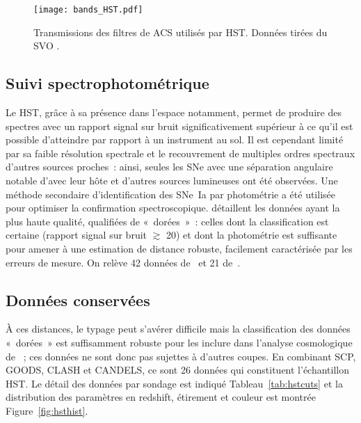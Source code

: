 \documentclass[../main/main.tex]{subfiles}
\begin{document}
\begin{figure}[!ht]
    \centering
    \texttt{[image: bands\_HST.pdf]}
    \caption[Transmissions des filtres de la caméra du sondage HST]
    {Transmissions des filtres de ACS utilisés par HST. Données tirées du SVO
    \citep{rodrigo2020}.}
    \label{fig:hstbands}
\end{figure}

\subsection{Suivi spectrophotométrique}\label{ssec:hstspectro}

Le HST, grâce à sa présence dans l'espace notamment, permet de produire des
spectres avec un rapport signal sur bruit significativement supérieur à ce qu'il
est possible d'atteindre par rapport à un instrument au sol. Il est cependant
limité par sa faible résolution spectrale et le recouvrement de multiples ordres
spectraux d'autres sources proches~: ainsi, seules les SNe avec une séparation
angulaire notable d'avec leur hôte et d'autres sources lumineuses ont été
observées. Une méthode secondaire d'identification des SNe~Ia par photométrie a
été utilisée pour optimiser la confirmation spectroscopique. \cite{riess2007}
détaillent les données ayant la plus haute qualité, qualifiées de «~dorées~»~:
celles dont la classification est certaine (rapport signal sur bruit $\gtrsim$
20) et dont la photométrie est suffisante pour amener à une estimation de
distance robuste, facilement caractérisée par les erreurs de mesure. On relève
42 données de~\cite{strolger2004} et 21 de~\cite{riess2007}.

\subsection{Données conservées}\label{ssec:hstdata}

À ces distances, le typage peut s'avérer difficile mais la classification des
données «~dorées~» est suffisamment robuste pour les inclure dans l'analyse
cosmologique de \citep{scolnic2018}~; ces données ne sont donc pas sujettes à
d'autres coupes. En combinant SCP, GOODS, CLASH et CANDELS, ce sont 26 données
qui constituent l'échantillon HST. Le détail des données par sondage est
indiqué Tableau~\ref{tab:hstcuts} et la distribution des paramètres en redshift,
étirement et couleur est montrée Figure~\ref{fig:hsthist}.
\end{document}
